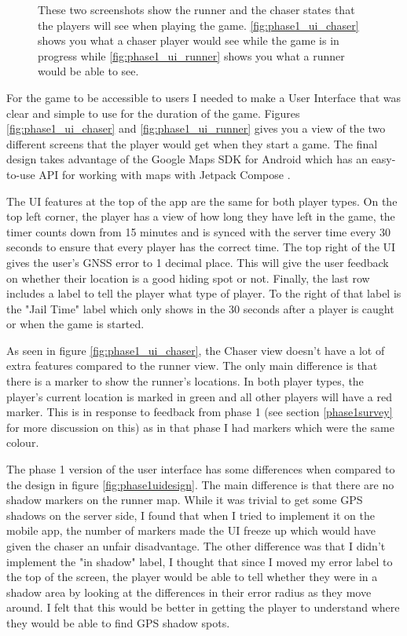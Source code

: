 \documentclass{l4proj}
\begin{document}
\begin{figure}
    \caption{These two screenshots show the runner and the chaser states that the players
    will see when playing the game. \ref{fig:phase1_ui_chaser} shows you what a chaser player would
    see while the game is in progress while \ref{fig:phase1_ui_runner} shows you what a runner would
    be able to see.
    }
\end{figure}
For the game to be accessible to users I needed to make a User Interface that was
clear and simple to use for the duration of the game. Figures \ref{fig:phase1_ui_chaser} and \ref{fig:phase1_ui_runner} 
gives you a view of the two different screens that the player would get when they start a
game. The final design takes advantage of the Google Maps SDK for Android which has
an easy-to-use API for working with maps with Jetpack Compose \citep{GoogleMaps}.

The UI features at the top of the app are the same for both player types. On the top
left corner, the player has a view of how long they have left in the game, the timer
counts down from 15 minutes and is synced with the server time every 30 seconds to 
ensure that every player has the correct time. The top right of the UI gives the
user's GNSS error to 1 decimal place. This will give the user feedback on whether
their location is a good hiding spot or not. Finally, the last row includes a label
to tell the player what type of player. To the right of that label is the "Jail Time"
label which only shows in the 30 seconds after a player is caught or when the game is
started.

As seen in figure \ref{fig:phase1_ui_chaser}, the Chaser view doesn't have a lot of extra features
compared to the runner view. The only main difference is that there is a marker to show the
runner's locations. In both player types, the player's current location is marked in green and
all other players will have a red marker. This is in response to feedback from phase 1 (see section
\ref{phase1survey} for more discussion on this) as in that phase I had markers which were the same
colour.

The phase 1 version of the user interface has some differences when compared to the design in figure \ref{fig:phase1uidesign}.
The main difference is that there are no shadow markers on the runner map. While it was trivial to get some GPS shadows on
the server side, I found that when I tried to implement it on the mobile app, the number of markers made the UI freeze up which
would have given the chaser an unfair disadvantage. The other difference was that I didn't implement the "in shadow" label,
I thought that since I moved my error label to the top of the screen, the player would be able to tell whether they were
in a shadow area by looking at the differences in their error radius as they move around. I felt that this would be better in
getting the player to understand where they would be able to find GPS shadow spots.
\end{document}
